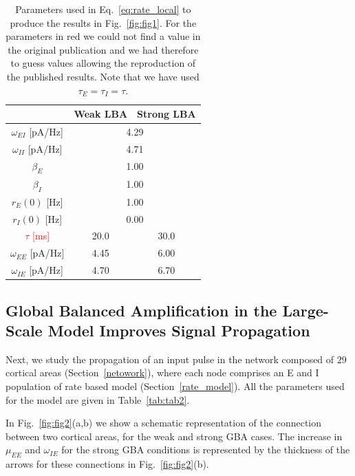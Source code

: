 \begin{table}[!ht]
\centering
\begin{tabular}{|c|c|c|}

\hline
                    & \textbf{Weak LBA} & \textbf{Strong LBA} \\ \hline
$\omega_{EI}$ [pA/Hz] & \multicolumn{2}{c|}{4.29}               \\ \hline
$\omega_{II}$ [pA/Hz] & \multicolumn{2}{c|}{4.71}               \\ \hline
$\beta_{E}$         & \multicolumn{2}{c|}{1.00}               \\ \hline
$\beta_{I}$         & \multicolumn{2}{c|}{1.00}               \\ \hline
$r_E(0)$ [Hz]           & \multicolumn{2}{c|}{1.00}               \\ \hline
$r_I(0)$ [Hz]           & \multicolumn{2}{c|}{0.00}               \\ \hline
\textcolor{red}{$\tau$ [ms]}           & 20.0              & 30.0                \\ \hline
$\omega_{EE}$ [pA/Hz] & 4.45              & 6.00                \\ \hline
$\omega_{IE}$ [pA/Hz] & 4.70              & 6.70                \\ \hline
\end{tabular}
\caption{Parameters used in Eq.~\ref{eq:rate_local} to produce the results in Fig.~\ref{fig:fig1}. For the parameters in red we could not find a value in the original publication and we had therefore to guess values allowing the reproduction of the published results. Note that we have used $\tau_{E} = \tau_{I} = \tau$.}\label{tab:tab1}
\end{table}

\subsection{Global Balanced Amplification
in the Large-Scale Model Improves Signal Propagation}\label{gba_rate}

Next, we study the propagation of an input pulse in the network composed of $29$ cortical areas \cite{markov2014b} (Section~\ref{netowork}), where each node comprises an E and I population of rate based model (Section~\ref{rate_model}). All the parameters used for the model are given in Table~\ref{tab:tab2}.

In Fig.~\ref{fig:fig2}(a,b) we show a schematic representation of the connection between two cortical areas, for the weak and strong GBA cases. The increase in $\mu_{EE}$ and $\omega_{IE}$ for the strong GBA conditions is represented by the thickness of the arrows for these connections in  Fig.~\ref{fig:fig2}(b).

